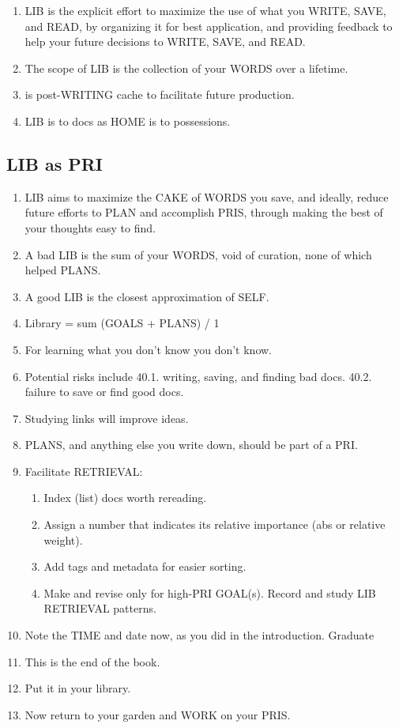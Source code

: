 \documentclass[
]{book}
\providecommand{\tightlist}{%
  \setlength{\itemsep}{0pt}\setlength{\parskip}{0pt}}
\begin{document}
\begin{enumerate}
\def\labelenumi{\arabic{enumi}.}
\setcounter{enumi}{30}
\tightlist
\item
  LIB is the explicit effort to maximize the use of what you WRITE, SAVE,
  and READ, by organizing it for best application, and providing feedback
  to help your future decisions to WRITE, SAVE, and READ.
\item
  The scope of LIB is the collection of your WORDS over a lifetime.
\item
  is post-WRITING cache to facilitate future production.
\item
  LIB is to docs as HOME is to possessions.
\end{enumerate}

\hypertarget{lib-as-pri}{%
\subsection{LIB as PRI}\label{lib-as-pri}}

\begin{enumerate}
\def\labelenumi{\arabic{enumi}.}
\setcounter{enumi}{34}
\tightlist
\item
  LIB aims to maximize the CAKE of WORDS you save, and ideally,
  reduce future efforts to PLAN and accomplish PRIS, through making
  the best of your thoughts easy to find.
\item
  A bad LIB is the sum of your WORDS, void of curation, none of which
  helped PLANS.
\item
  A good LIB is the closest approximation of SELF.
\item
  Library = sum (GOALS + PLANS) / 1
\item
  For learning what you don't know you don't know.
\item
  Potential risks include
  40.1. writing, saving, and finding bad docs.
  40.2. failure to save or find good docs.
\item
  Studying links will improve ideas.
\item
  PLANS, and anything else you write down, should be part of a PRI.
\item
  Facilitate RETRIEVAL:

  \begin{enumerate}
  \def\labelenumii{\arabic{enumii}.}
  \tightlist
  \item
    Index (list) docs worth rereading.
  \item
    Assign a number that indicates its relative importance (abs or
    relative weight).
  \item
    Add tags and metadata for easier sorting.
  \item
    Make and revise only for high-PRI GOAL(s). Record and study LIB RETRIEVAL patterns.
  \end{enumerate}
\item
  Note the TIME and date now, as you did in the introduction.
  Graduate
\item
  This is the end of the book.
\item
  Put it in your library.
\item
  Now return to your garden and WORK on your PRIS.
\end{enumerate}
\end{document}
